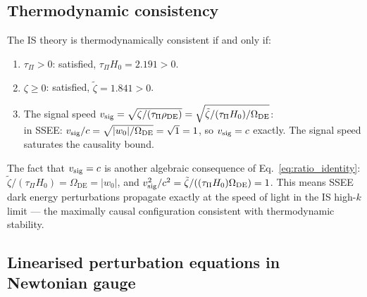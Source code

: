 \documentclass[12pt,a4paper]{article}
\newcommand{\wz}{w_0}
\newcommand{\OmDE}{\Omega_{\mathrm{DE}}}
\newcommand{\tauPi}{\tau_\Pi}
\newcommand{\ztilde}{\tilde{\zeta}}
\begin{document}
\subsection{Thermodynamic consistency}
\label{subsec:thermodynamic}

The IS theory is thermodynamically consistent if and only if:
\begin{enumerate}[label=(\roman*)]
  \item $\tauPi > 0$: satisfied, $\tauPi H_0 = 2.191 > 0$.
  \item $\zeta \geq 0$: satisfied, $\ztilde = 1.841 > 0$.
  \item The signal speed $v_{\rm sig} = \sqrt{\zeta/(\tauPi\rho_{\mathrm{DE}})}
    = \sqrt{\ztilde/(\tauPi H_0)/\OmDE}$:\\
    in SSEE: $v_{\rm sig}/c = \sqrt{|\wz|/\OmDE} = \sqrt{1} = 1$,
    so $v_{\rm sig} = c$ exactly. The signal speed saturates the causality bound.
\end{enumerate}
The fact that $v_{\rm sig} = c$ is another algebraic consequence of
Eq.~\eqref{eq:ratio_identity}: $\ztilde/(\tauPi H_0) = \OmDE = |\wz|$, and
$v_{\rm sig}^2/c^2 = \ztilde/((\tauPi H_0)\OmDE) = 1$.
This means SSEE dark energy perturbations propagate exactly at the speed of light
in the IS high-$k$ limit — the maximally causal configuration consistent with
thermodynamic stability.

\subsection{Linearised perturbation equations in Newtonian gauge}
\label{subsec:perturb_eqs}
\end{document}
